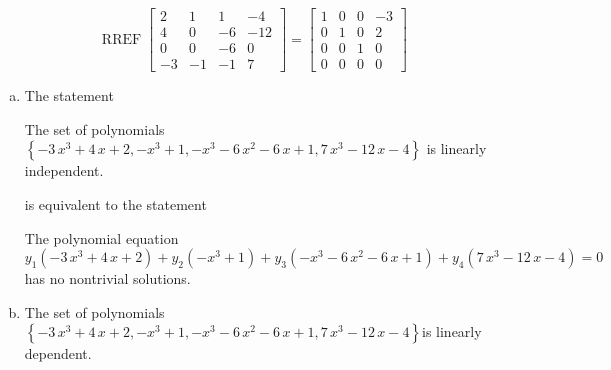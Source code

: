 \begin{exerciseAnswer} 


\[\operatorname{RREF} \left[\begin{array}{cccc}
2 & 1 & 1 & -4 \\
4 & 0 & -6 & -12 \\
0 & 0 & -6 & 0 \\
-3 & -1 & -1 & 7
\end{array}\right] = \left[\begin{array}{cccc}
1 & 0 & 0 & -3 \\
0 & 1 & 0 & 2 \\
0 & 0 & 1 & 0 \\
0 & 0 & 0 & 0
\end{array}\right] \]


\begin{enumerate}[(a)]
\item The statement 
\begin{center}\begin{minipage}{0.8\textwidth}
 The set of polynomials \( \left\{ -3 \, x^{3} + 4 \, x + 2 , -x^{3} + 1 , -x^{3} - 6 \, x^{2} - 6 \, x + 1 , 7 \, x^{3} - 12 \, x - 4 \right\} \) is linearly independent.
\end{minipage}\end{center}
     is equivalent to the statement 
\begin{center}\begin{minipage}{0.8\textwidth}
 The polynomial equation \[ y_{1} \left( -3 \, x^{3} + 4 \, x + 2 \right) + y_{2} \left( -x^{3} + 1 \right) + y_{3} \left( -x^{3} - 6 \, x^{2} - 6 \, x + 1 \right) + y_{4} \left( 7 \, x^{3} - 12 \, x - 4 \right) = 0 \] has no nontrivial solutions. 
\end{minipage}\end{center}
    
\item The set of polynomials \( \left\{ -3 \, x^{3} + 4 \, x + 2 , -x^{3} + 1 , -x^{3} - 6 \, x^{2} - 6 \, x + 1 , 7 \, x^{3} - 12 \, x - 4 \right\} \)is linearly dependent.
\end{enumerate}
    
\end{exerciseAnswer}
    
